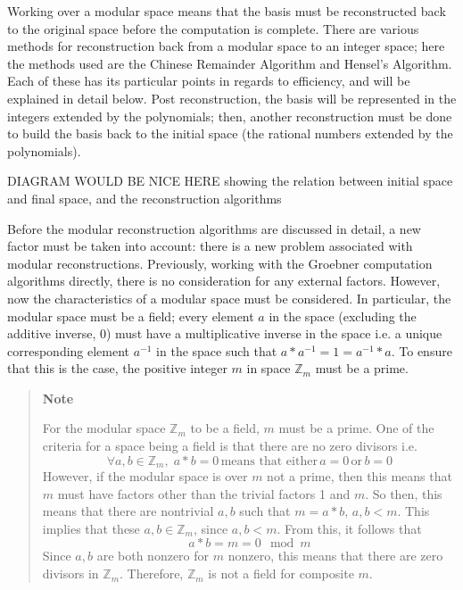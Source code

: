 \documentclass[letterpaper,12pt,titlepage,oneside,final]{book}
\newcounter{notecounter}
\newenvironment{note}{\begin{quote}%
    \refstepcounter{notecounter}%
  \textbf{Note \arabic{notecounter}}%
  \quad
}{%
\end{quote}%
}
\begin{document}
Working over a modular space means that the basis must be reconstructed back to the original space before the computation is complete.  There are various methods for reconstruction back from a modular space to an integer space; here the methods used are the Chinese Remainder Algorithm and Hensel's Algorithm.  Each of these has its particular points in regards to efficiency, and will be explained in detail below.  Post reconstruction, the basis will be represented in the integers extended by the polynomials; then, another reconstruction must be done to build the basis back to the initial space (the rational numbers extended by the polynomials).    

DIAGRAM WOULD BE NICE HERE showing the relation between initial space and final space, and the reconstruction algorithms

Before the modular reconstruction algorithms are discussed in detail, a new factor must be taken into account: there is a new problem associated with modular reconstructions.  Previously, working with the Groebner computation algorithms directly, there is no consideration for any external factors.  However, now the characteristics of a modular space must be considered.  In particular, the modular space must be a field; every element ${a}$ in the space (excluding the additive inverse, 0) must have a multiplicative inverse in the space i.e. a unique corresponding element ${a^{-1}}$ in the space such that ${a*a^{-1} = 1 = a^{-1}*a}$.  To ensure that this is the case, the positive integer ${m}$ in space ${\mathbb{Z}_m}$ must be a prime.

\begin{note}
  For the modular space ${\mathbb{Z}_m}$ to be a field, ${m}$ must be a prime.  One of the criteria for a space being a field is that there are no zero divisors i.e. 
  \begin{equation*}  \forall a, b \in \mathbb{Z}_m,\; a*b = 0 \, \textrm{means that either} \, a = 0 \, \textrm{or} \, b = 0 \end{equation*}
  However, if the modular space is over ${m}$ not a prime, then this means that ${m}$ must have factors other than the trivial factors 1 and ${m}$.  So then, this means that there are nontrivial ${a, b}$ such that ${m = a*b, \, a, b < m}$.   This implies that these ${a, b \in \mathbb{Z}_m}$, since ${a, b < m}$.  From this, it follows that 
  \begin{equation*} a*b = m = 0 \mod m \end{equation*}
  Since ${a, b}$ are both nonzero for ${m}$ nonzero, this means that there are zero divisors in ${\mathbb{Z}_m}$.  Therefore, ${\mathbb{Z}_m}$ is not a field for composite ${m}$.
\end{note}
\end{document}
